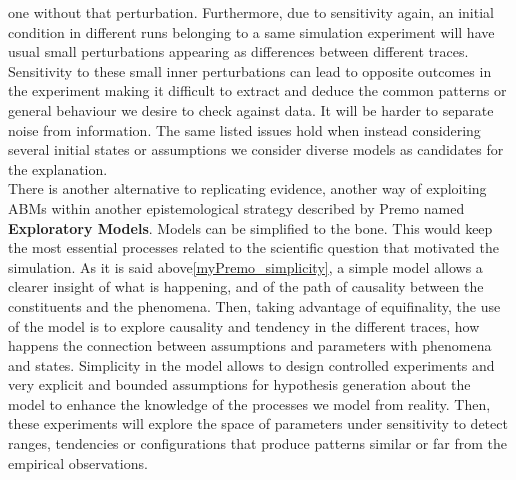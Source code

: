 \documentclass[11pt,oneside,a4paper,openright]{report}
\begin{document}
one without that perturbation. Furthermore, due to sensitivity again, an initial condition in different runs belonging to a same simulation experiment will have usual small perturbations appearing as differences between different traces. Sensitivity to these small inner perturbations can lead to opposite outcomes in the experiment making it difficult to extract and deduce the common patterns or general behaviour we desire to check against data. It will be harder to separate noise from information. The same listed issues hold when instead considering several initial states or assumptions we consider diverse models as candidates for the explanation.\\
%
%
%
% 
%
There is another alternative to replicating evidence, another way of exploiting ABMs within another epistemological strategy described by Premo \cite[p.33-34]{Premo2010} named \textbf{Exploratory Models}. Models can be simplified to the bone. This would keep the most essential processes related to the scientific question that motivated the simulation. As it is said above\ref{myPremo_simplicity}, a simple model allows a clearer insight of what is happening, and of the path of causality between the constituents and the phenomena. Then, taking advantage of equifinality, the use of the model is to explore causality and tendency in the different traces, how happens the connection between assumptions and parameters with phenomena and states. Simplicity in the model allows to design controlled experiments and very explicit and bounded assumptions for hypothesis generation about the model to enhance the knowledge of the processes we model from reality. Then, these experiments will explore the space of parameters under sensitivity to detect ranges, tendencies or configurations that produce patterns similar or far from the empirical observations.\\ 
\end{document}
